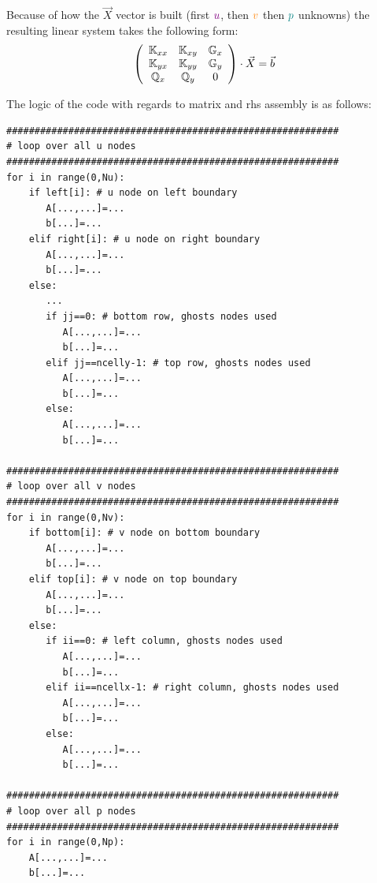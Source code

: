 Because of how the $\vec{X}$ vector is built (first ${\color{violet} u}$, 
then ${\color{orange}v}$ then ${\color{teal} p}$ unknowns)
the resulting linear system takes the following form:
\begin{equation}
\left(
\begin{array}{ccc}
{\mathbb{K}}_{xx} & {\mathbb{K}}_{xy} & {\mathbb{G}}_x \\
{\mathbb{K}}_{yx} & {\mathbb{K}}_{yy} & {\mathbb{G}}_y \\
{\mathbb{Q}}_x & {\mathbb{Q}}_y & 0
\end{array}
\right)
\cdot
\vec{X}
=\vec{b}
\label{eq:fdmstokes6}
\end{equation}


\newpage
The logic of the code with regards to matrix and rhs assembly is as follows:

\begin{lstlisting}
###########################################################
# loop over all u nodes
###########################################################
for i in range(0,Nu):
    if left[i]: # u node on left boundary
       A[...,...]=...
       b[...]=...
    elif right[i]: # u node on right boundary
       A[...,...]=...
       b[...]=...
    else:
       ...
       if jj==0: # bottom row, ghosts nodes used
          A[...,...]=...
          b[...]=...
       elif jj==ncelly-1: # top row, ghosts nodes used
          A[...,...]=...
          b[...]=...
       else:
          A[...,...]=...
          b[...]=...

###########################################################
# loop over all v nodes
###########################################################
for i in range(0,Nv):
    if bottom[i]: # v node on bottom boundary
       A[...,...]=...
       b[...]=...
    elif top[i]: # v node on top boundary
       A[...,...]=...
       b[...]=...
    else:
       if ii==0: # left column, ghosts nodes used
          A[...,...]=...
          b[...]=...
       elif ii==ncellx-1: # right column, ghosts nodes used
          A[...,...]=...
          b[...]=...
       else:
          A[...,...]=...
          b[...]=...

###########################################################
# loop over all p nodes
###########################################################
for i in range(0,Np):
    A[...,...]=...
    b[...]=...
\end{lstlisting}

\newpage

